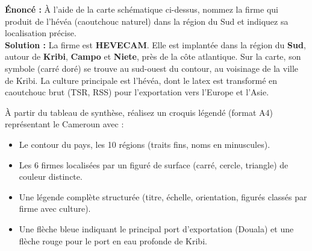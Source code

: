 \documentclass[11pt]{article}
\begin{document}
\begin{exoresolu}
\textbf{Énoncé :} À l'aide de la carte schématique ci-dessus, nommez la firme qui produit de l'hévéa (caoutchouc naturel) dans la région du Sud et indiquez sa localisation précise. \\
\tcblower
\textbf{Solution :} La firme est \textbf{HEVECAM}. Elle est implantée dans la région du \textbf{Sud}, autour de \textbf{Kribi}, \textbf{Campo} et \textbf{Niete}, près de la côte atlantique. Sur la carte, son symbole (carré doré) se trouve au sud-ouest du contour, au voisinage de la ville de Kribi. La culture principale est l'hévéa, dont le latex est transformé en caoutchouc brut (TSR, RSS) pour l'exportation vers l'Europe et l'Asie.
\end{exoresolu}

\begin{exercice}
À partir du tableau de synthèse, réalisez un croquis légendé (format A4) représentant le Cameroun avec :
\begin{itemize}
\item Le contour du pays, les 10 régions (traits fins, noms en minuscules).
\item Les 6 firmes localisées par un figuré de surface (carré, cercle, triangle) de couleur distincte.
\item Une légende complète structurée (titre, échelle, orientation, figurés classés par firme avec culture).
\item Une flèche bleue indiquant le principal port d'exportation (Douala) et une flèche rouge pour le port en eau profonde de Kribi.
\end{itemize}
\end{exercice}
\end{document}
